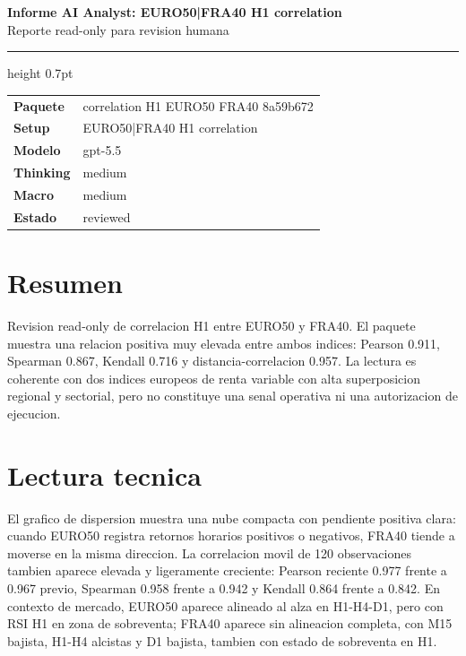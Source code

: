 \documentclass[11pt,a4paper]{article}
\begin{document}
\begin{center}
{\huge\bfseries Informe AI Analyst: EURO50|FRA40 H1 correlation}\\[0.25em]
{\large Reporte read-only para revision humana}
\end{center}

\vspace{0.2em}
\hrule height 0.7pt
\vspace{0.9em}

\begin{tabularx}{\textwidth}{>{\bfseries}p{3.2cm}X}
Paquete & correlation H1 EURO50 FRA40 8a59b672 \\
Setup & EURO50|FRA40 H1 correlation \\
Modelo & gpt-5.5 \\
Thinking & medium \\
Macro & medium \\
Estado & reviewed \\
\end{tabularx}

\vspace{0.75em}

\vspace{0.4em}

\section*{Resumen}
Revision read-only de correlacion H1 entre EURO50 y FRA40. El paquete muestra una relacion positiva muy elevada entre ambos indices: Pearson 0.911, Spearman 0.867, Kendall 0.716 y distancia-correlacion 0.957. La lectura es coherente con dos indices europeos de renta variable con alta superposicion regional y sectorial, pero no constituye una senal operativa ni una autorizacion de ejecucion.

\section*{Lectura tecnica}
El grafico de dispersion muestra una nube compacta con pendiente positiva clara: cuando EURO50 registra retornos horarios positivos o negativos, FRA40 tiende a moverse en la misma direccion. La correlacion movil de 120 observaciones tambien aparece elevada y ligeramente creciente: Pearson reciente 0.977 frente a 0.967 previo, Spearman 0.958 frente a 0.942 y Kendall 0.864 frente a 0.842. En contexto de mercado, EURO50 aparece alineado al alza en H1-H4-D1, pero con RSI H1 en zona de sobreventa; FRA40 aparece sin alineacion completa, con M15 bajista, H1-H4 alcistas y D1 bajista, tambien con estado de sobreventa en H1.
\end{document}
